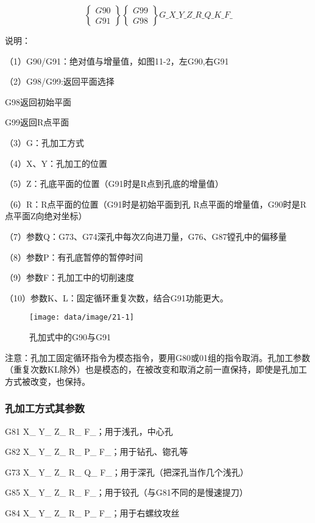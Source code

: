 \[ 
\left\lbrace 
\begin{array}{c}
G90 \\ G91
\end{array} 
\right\rbrace 
\left\lbrace 
\begin{array}{c}
G99 \\ G98
\end{array} 
\right\rbrace  
 G\_ X\_ Y\_ Z\_ R\_ Q\_ K\_ F\_    \]

说明：

（1）G90/G91：绝对值与增量值，如图11-2，左G90,右G91

（2）G98/G99:返回平面选择

G98返回初始平面

G99返回R点平面

（3）G：孔加工方式

（4）X、Y：孔加工的位置

（5）Z：孔底平面的位置（G91时是R点到孔底的增量值）

（6）R：R点平面的位置（G91时是初始平面到孔
R点平面的增量值，G90时是R点平面Z向绝对坐标）

（7）参数Q：G73、G74深孔中每次Z向进刀量，G76、G87镗孔中的偏移量

（8）参数P：有孔底暂停的暂停时间

（9）参数F：孔加工中的切削速度

（10）参数K、L：固定循环重复次数，结合G91功能更大。

\begin{figure}[h]
	\centering
	\texttt{[image: data/image/21-1]}
	\caption{孔加式中的G90与G91}
	\label{fig:21-1}
\end{figure}

注意：孔加工固定循环指令为模态指令，要用G80或01组的指令取消。孔加工参数（重复次数KL除外）也是模态的，在被改变和取消之前一直保持，即使是孔加工方式被改变，也保持。



\subsubsection{孔加工方式其参数}
G81 X\_ Y\_ Z\_ R\_ F\_；用于浅孔，中心孔

G82 X\_ Y\_ Z\_ R\_ P\_ F\_；用于钻孔、锪孔等 

G73 X\_ Y\_ Z\_ R\_ Q\_ F\_；用于深孔（把深孔当作几个浅孔）

G85 X\_ Y\_ Z\_ R\_ F\_；用于铰孔（与G81不同的是慢速提刀）

G84 X\_ Y\_ Z\_ R\_ P\_ F\_；用于右螺纹攻丝

